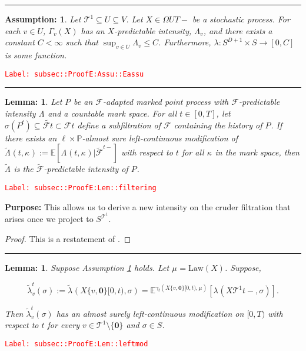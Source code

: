 \documentclass[12pt]{article}
\newcommand{\mb}{\mathbb}
\newcommand{\mc}{\mathcal}
\newcommand{\ra}{\rightarrow}
\newcommand{\te}{\text}
\newcommand{\tr}{\textcolor{red}}
\newcommand{\labe}[1]{\tr{\texttt{Label: #1}}}
\newcommand{\purpose}{\textbf{Purpose: }}
\newcommand{\lin}{\rule{\linewidth}{0.4 pt}}
\newcommand{\pr}{\mb{P}}							%
\newcommand{\ex}[1]{\mb{E}\left[#1\right]}			%
\newcommand{\exmu}[2]{\mb{E}^{#1}\left[#2\right]}	%
\renewcommand{\root}{\mathbf{0}}				%
\renewcommand{\v}{v}							%
\renewcommand{\U}{U}							%
\renewcommand{\S}{S}							%
\newcommand{\s}{\sigma}							%
\newcommand{\T}{T}								%
\renewcommand{\t}{t}							%
\newcommand{\F}{\mc{F}}							%
\newcommand{\X}{X}								%
\newcommand{\const}{C}							%
\newcommand{\degr}{D}							%
\newcommand{\tree}{\mc{T}}						%
\newcommand{\sln}[1]{^{#1}}						%
\newcommand{\law}{\te{Law}}							%
\newcommand{\rp}[1]{P^{#1}}							%
\newcommand{\m}[3]{\mu_{#2#1}^{#3}}						%
\newcommand{\cm}{\gamma}							%
\newcommand{\rate}[1]{\lambda_{#1}}					%
\newcommand{\ratee}[1]{\Lambda_{#1}}				%
\newcommand{\crate}[2]{\alt{\lambda}_{#1}^{#2}}		%
\newcommand{\cratee}[2]{\alt{\Lambda}_{#1}^{#2}} 	%
\newcommand{\Sm}{\ell}								%
\newcommand{\alt}{\widetilde}						%
\renewcommand{\mark}[1]{\kappa^{#1}}				%
\newcommand{\pmap}[1]{\Gamma_{#1}}				%
\newtheorem{lem}[thms]{Lemma: }
\newtheorem{assu}[thms]{Assumption: }
\begin{document}
\lin

\begin{assu}
Let \(\tree\sln{1}\subseteq\U \subseteq  V\). Let \(\X{}{}\in \Omega{\U}{\T-}\) be a stochastic process. For each \(\v\in \U\), \(\pmap{\v}(\X{}{})\) has an \(\X{}{}\)-predictable intensity, \(\ratee{\v}\), and there exists a constant \(\const{} < \infty\) such that \(\sup_{\v\in\U} \ratee{\v} \leq \const{}\). Furthermore, \(\lambda: \S^{\degr+1}\times \S\ra[0,\const{}]\) is some function.
\label{subsec::ProofE:Assu::Eassu}
\end{assu}
\labe{subsec::ProofE:Assu::Eassu}

\lin

\begin{lem}
Let \(\rp{}\) be an \(\F{}{}\)-adapted marked point process with \(\F{}{}\)-predictable intensity \(\ratee{}\) and a countable mark space. For all \(\t \in [0,\T]\), let \(\sigma(\rp{\t}) \subseteq \alt{\F{}{\t}}\subset \F{}{\t}\) define a subfiltration of \(\F{}{}\) containing the history of \(\rp{}\). If there exists an \(\Sm\times \pr\)-almost sure left-continuous modification of \(\cratee{}{}(\t,\mark{}) := \ex{\ratee{}(\t,\mark{})|\alt{\F{}{}}^{\t-}}\) with respect to \(\t\) for all \(\mark{}\) in the mark space, then \(\cratee{}{}\) is the \(\alt{\F{}{}}\)-predictable intensity of \(\rp{}\).
\label{subsec::ProofE:Lem::filtering}
\end{lem}
\labe{subsec::ProofE:Lem::filtering}

\purpose This allows us to derive a new intensity on the cruder filtration that arises once we project to \(\S^{\tree^1}\).

\begin{proof}
This is a restatement of \cite[Theorem 14.3.III]{DalVer08}.
\end{proof}

\lin

\begin{lem}
Suppose Assumption \ref{subsec::ProofE:Assu::Eassu} holds. Let \(\m{}{}{} = \law(\X{}{})\). Suppose,

\[\crate{\v}{\t}(\s) := \crate{}{}(\X{\{\v,\root\}}{[0,\t)},\s) = \exmu{\cm_\t(\X{\{\v,\root\}}{[0,\t)},\m{}{}{})}{\rate{}(\X{\tree\sln{1}}{\t-},\s)}.\]


Then \(\crate{\v}{\t}(\s)\) has an almost surely left-continuous modification on \([0,\T)\) with respect to \(\t\) for every \(\v \in \tree\sln{1}\setminus\{\root\}\) and \(\s \in \S\).
\label{subsec::ProofE:Lem::leftmod}
\end{lem}
\labe{subsec::ProofE:Lem::leftmod}
\end{document}
